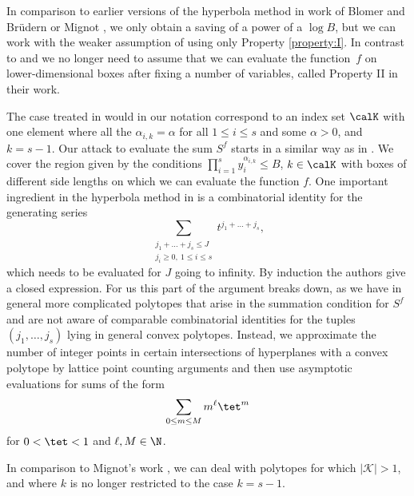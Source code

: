 In comparison to earlier versions of the hyperbola method in work of Blomer and Brüdern \cite{BB} or Mignot \cite{mignot2}, we only obtain a saving of a power of a $\log B$, but we can work with the weaker assumption of using only Property \ref{property:I}. In contrast to \cite{BB} and \cite{mignot2} we no longer need to assume that we can evaluate the function~$f$ on lower-dimensional boxes after fixing a number of variables, called Property II in their work.\par
The case treated in \cite{BB} would in our notation correspond to an index set $\calK$ with one element where all the $\alpha_{i,k}=\alpha$ for all $1\leq i\leq s$ and some $\alpha>0$, and $k=s-1$. Our attack to evaluate the sum $S^f$ starts in a similar way as in \cite{BB}. We cover the region given by the conditions $\prod_{i=1}^s y_i^{\alpha_{i,k}}\leq B$, $k\in \calK$ with boxes of different side lengths on which we can evaluate the function $f$. One important ingredient in the hyperbola method in \cite{BB} is a combinatorial identity for the generating series
\[
\sum_{\substack{j_1+\ldots +j_s\leq J\\ j_i\geq 0,\ 1\leq i\leq s}}t^{j_1+\ldots + j_s},
\]
which needs to be evaluated for $J$ going to infinity. By induction the authors give a closed expression. For us this part of the argument breaks down, as we have in general more complicated polytopes that arise in the summation condition for $S^f$ and are not aware of comparable combinatorial identities for the tuples $(j_1,\ldots, j_s)$ lying in general convex polytopes. Instead, we approximate the number of integer points in certain intersections of hyperplanes with a convex polytope by lattice point counting arguments and then use asymptotic evaluations for sums of the form
\[
\sum_{0\leq m\leq M} m^\ell \tet^m
\]
for $0<\tet<1$ and $\ell,M\in \N$.\par
In comparison to Mignot's work \cite{mignot2}, we can deal with polytopes for which $|\mathcal{K}|>1$, and where $k$ is no longer restricted to the case $k=s-1$.

